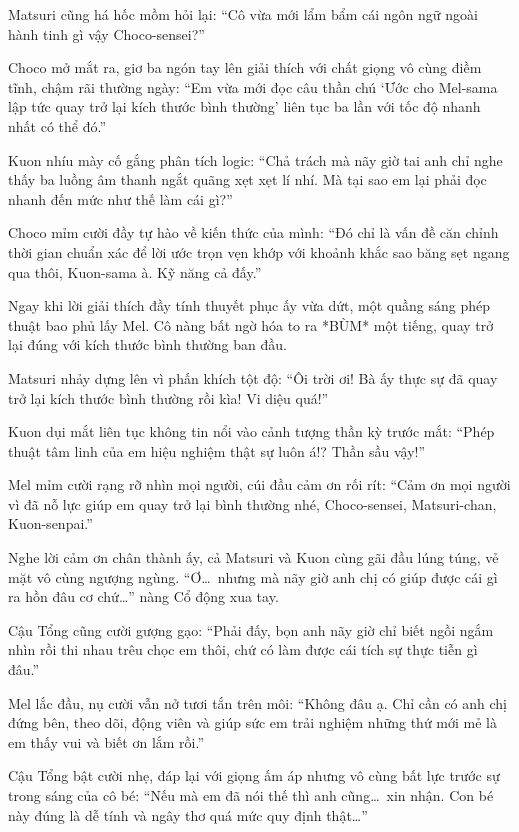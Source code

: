 \documentclass[../main.tex]{subfiles}
\begin{document}
Matsuri cũng há hốc mồm hỏi lại:
``Cô vừa mới lẩm bẩm cái ngôn ngữ ngoài hành tinh gì vậy Choco-sensei?''

Choco mở mắt ra, giơ ba ngón tay lên giải thích với chất giọng vô cùng điềm tĩnh, chậm rãi thường ngày:
``Em vừa mới đọc câu thần chú `Ước cho Mel-sama lập tức quay trở lại kích thước bình thường' liên tục ba lần với tốc độ nhanh nhất có thể đó.''

Kuon nhíu mày cố gắng phân tích logic:
``Chả trách mà nãy giờ tai anh chỉ nghe thấy ba luồng âm thanh ngắt quãng xẹt xẹt lí nhí. Mà tại sao em lại phải đọc nhanh đến mức như thế làm cái gì?''

Choco mỉm cười đầy tự hào về kiến thức của mình:
``Đó chỉ là vấn đề căn chỉnh thời gian chuẩn xác để lời ước trọn vẹn khớp với khoảnh khắc sao băng sẹt ngang qua thôi, Kuon-sama à. Kỹ năng cả đấy.''

Ngay khi lời giải thích đầy tính thuyết phục ấy vừa dứt, một quầng sáng phép thuật bao phủ lấy Mel. Cô nàng bất ngờ hóa to ra *BÙM* một tiếng, quay trở lại đúng với kích thước bình thường ban đầu.


Matsuri nhảy dựng lên vì phấn khích tột độ:
``Ôi trời ơi! Bà ấy thực sự đã quay trở lại kích thước bình thường rồi kìa! Vi diệu quá!''

Kuon dụi mắt liên tục không tin nổi vào cảnh tượng thần kỳ trước mắt:
``Phép thuật tâm linh của em hiệu nghiệm thật sự luôn á!? Thần sầu vậy!''

Mel mỉm cười rạng rỡ nhìn mọi người, cúi đầu cảm ơn rối rít:
``Cảm ơn mọi người vì đã nỗ lực giúp em quay trở lại bình thường nhé, Choco-sensei, Matsuri-chan, Kuon-senpai.''

Nghe lời cảm ơn chân thành ấy, cả Matsuri và Kuon cùng gãi đầu lúng túng, vẻ mặt vô cùng ngượng ngùng.
``Ơ\dots\ nhưng mà nãy giờ anh chị có giúp được cái gì ra hồn đâu cơ chứ\dots'' nàng Cổ động xua tay.

Cậu Tổng cũng cười gượng gạo:
``Phải đấy, bọn anh nãy giờ chỉ biết ngồi ngắm nhìn rồi thi nhau trêu chọc em thôi, chứ có làm được cái tích sự thực tiễn gì đâu.''

Mel lắc đầu, nụ cười vẫn nở tươi tắn trên môi:
``Không đâu ạ. Chỉ cần có anh chị đứng bên, theo dõi, động viên và giúp sức em trải nghiệm những thứ mới mẻ là em thấy vui và biết ơn lắm rồi.''

Cậu Tổng bật cười nhẹ, đáp lại với giọng ấm áp nhưng vô cùng bất lực trước sự trong sáng của cô bé:
``Nếu mà em đã nói thế thì anh cũng\dots\ xin nhận. Con bé này đúng là dễ tính và ngây thơ quá mức quy định thật\dots''
\end{document}
